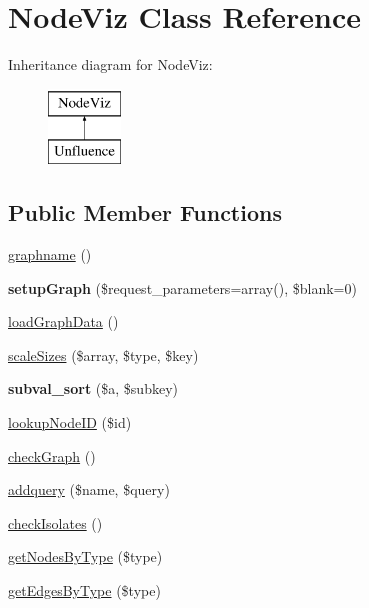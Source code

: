 \hypertarget{classNodeViz}{
\section{NodeViz Class Reference}
\label{classNodeViz}
}
Inheritance diagram for NodeViz:\begin{figure}[H]
\begin{center}
\leavevmode
\includegraphics[height=2.000000cm]{classNodeViz}
\end{center}
\end{figure}
\subsection*{Public Member Functions}
\begin{DoxyCompactItemize}
\item 
\hyperlink{classNodeViz_a713abe9f93bbb3e20d79d89751ff5f07}{graphname} ()
\item 
\hypertarget{classNodeViz_a48217350dd979a212fcdd175c95f7574}{
{\bfseries setupGraph} (\$request\_\-parameters=array(), \$blank=0)}
\label{classNodeViz_a48217350dd979a212fcdd175c95f7574}

\item 
\hyperlink{classNodeViz_a936052a8b7e5e4f2210a7a4f4a0c5d7e}{loadGraphData} ()
\item 
\hyperlink{classNodeViz_a0a8a15509e46fef208257105b2589882}{scaleSizes} (\$array, \$type, \$key)
\item 
\hypertarget{classNodeViz_a59d6fce5a408fb848b351955ea3f3296}{
{\bfseries subval\_\-sort} (\$a, \$subkey)}
\label{classNodeViz_a59d6fce5a408fb848b351955ea3f3296}

\item 
\hyperlink{classNodeViz_a9954743bc34dca28270913a8fe3c5468}{lookupNodeID} (\$id)
\item 
\hyperlink{classNodeViz_a3bbd5ae3fb61c26fde757d6393fb0a75}{checkGraph} ()
\item 
\hyperlink{classNodeViz_afed66215ed0628d931713fe654d13ebc}{addquery} (\$name, \$query)
\item 
\hyperlink{classNodeViz_aa9fcbd43ffae6cf1b1d65d02e02cb88d}{checkIsolates} ()
\item 
\hyperlink{classNodeViz_ae0ca6b02fb3326b323a8cdc77d7222b8}{getNodesByType} (\$type)
\item 
\hyperlink{classNodeViz_a4de3aa73b1ef90195559c221632a1488}{getEdgesByType} (\$type)
\end{DoxyCompactItemize}
